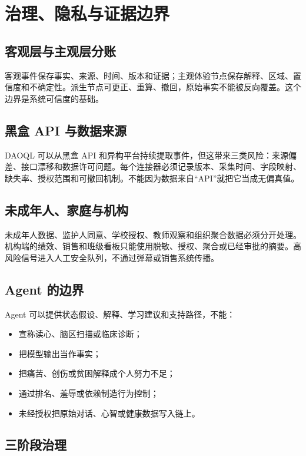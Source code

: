 \documentclass[UTF8,a4paper,11pt]{ctexart}
\begin{document}
\newpage
\section{治理、隐私与证据边界}

\subsection{客观层与主观层分账}

客观事件保存事实、来源、时间、版本和证据；主观体验节点保存解释、区域、置信度和不确定性。派生节点可更正、重算、撤回，原始事实不能被反向覆盖。这个边界是系统可信度的基础。

\subsection{黑盒 API 与数据来源}

DAOQL 可以从黑盒 API 和异构平台持续提取事件，但这带来三类风险：来源偏差、接口漂移和数据许可问题。每个连接器必须记录版本、采集时间、字段映射、缺失率、授权范围和可撤回机制。不能因为数据来自“API”就把它当成无偏真值。

\subsection{未成年人、家庭与机构}

未成年人数据、监护人同意、学校授权、教师观察和组织聚合数据必须分开处理。机构端的绩效、销售和班级看板只能使用脱敏、授权、聚合或已经审批的摘要。高风险信号进入人工安全队列，不通过弹幕或销售系统传播。

\subsection{Agent 的边界}

Agent 可以提供状态假设、解释、学习建议和支持路径，不能：

\begin{itemize}
\item 宣称读心、脑区扫描或临床诊断；
\item 把模型输出当作事实；
\item 把痛苦、创伤或贫困解释成个人努力不足；
\item 通过排名、羞辱或依赖制造行为控制；
\item 未经授权把原始对话、心智或健康数据写入链上。
\end{itemize}

\subsection{三阶段治理}
\end{document}
